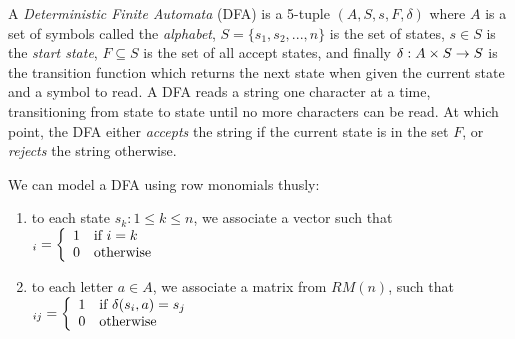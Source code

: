 A \emph{Deterministic Finite Automata} (DFA) is a 5-tuple
$(A,S,s,F,\delta)$ where $A$ is a set of symbols called the
\emph{alphabet}, $S = \{ s_1, s_2, ..., n \} $ is the set of states,
$s \in S$ is the \emph{start state}, $F \subseteq S$ is the set of all
accept states, and finally $\delta: A \times S \rightarrow S$ is the
transition function which returns the next state when given the
current state and a symbol to read.  A DFA reads a string one
character at a time, transitioning from state to state until no more
characters can be read.  At which point, the DFA either \emph{accepts}
the string if the current state is in the set $F$, or \emph{rejects}
the string otherwise.

We can model a DFA using row monomials thusly:

\begin{enumerate}
\item to each state $s_k : 1 \leq k \leq n$, we associate a vector
  such that
  \begin{math}
    [s]_i = \left\{
      \begin{array}{l l}
        1 & \text{if } i = k \\
        0 & \text{otherwise}
      \end{array} \right.
  \end{math}

\item to each letter $a \in A$, we associate a matrix from $RM(n)$,
  such that
  \begin{math}
    [a]_{ij} = \left\{
      \begin{array}{l l}
        1 & \text{if } \delta(s_i,a) = s_j \\
        0 & \text{otherwise}
      \end{array} \right.
  \end{math}
\end{enumerate}